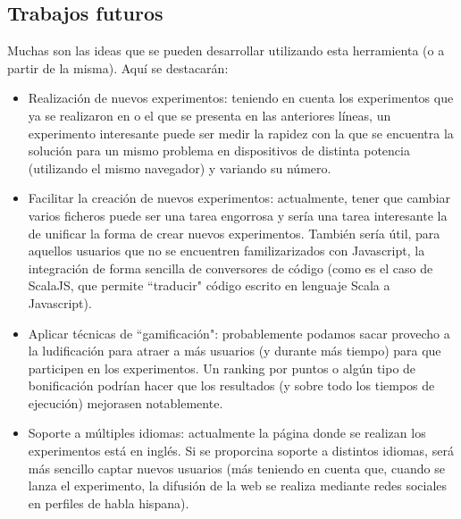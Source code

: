 \documentclass[runningheads,a4paper]{llncs}
\begin{document}
\subsection{Trabajos futuros}
Muchas son las ideas que se pueden desarrollar utilizando esta herramienta (o a
partir de la misma). Aqu\'i se destacar\'an:
\begin{itemize}
  \item Realizaci\'on de nuevos experimentos: teniendo en cuenta los experimentos
  que ya se realizaron en \cite{nodio} o el que se presenta en las anteriores l\'ineas,
  un experimento interesante puede ser medir la rapidez con la que se encuentra
  la soluci\'on para un mismo problema en dispositivos de distinta potencia (utilizando
  el mismo navegador) y variando su n\'umero.
  \item Facilitar la creaci\'on de nuevos experimentos: actualmente, tener que cambiar
  varios ficheros puede ser una tarea engorrosa y sería una tarea interesante
  la de unificar la forma de crear nuevos experimentos. También sería útil, para
  aquellos usuarios que no se encuentren familizarizados con Javascript, la
  integraci\'on de forma sencilla de conversores de c\'odigo (como es el caso de ScalaJS,
  que permite ``traducir" c\'odigo escrito en lenguaje Scala a Javascript).
  \item Aplicar t\'ecnicas de ``gamificaci\'on": probablemente podamos sacar
  provecho a la ludificaci\'on para atraer a m\'as usuarios (y durante m\'as tiempo)
  para que participen en los experimentos. Un ranking por puntos o alg\'un tipo de
  bonificaci\'on podr\'ian hacer que los resultados (y sobre todo los tiempos de
  ejecuci\'on) mejorasen notablemente.
  \item Soporte a m\'ultiples idiomas: actualmente la p\'agina donde se realizan los
  experimentos est\'a en ingl\'es. Si se proporcina soporte a distintos idiomas,
  ser\'a m\'as sencillo captar nuevos usuarios (m\'as teniendo en cuenta que,
  cuando se lanza el experimento, la difusi\'on de la web se realiza mediante
  redes sociales en perfiles de habla hispana).
\end{itemize}





\end{document}
